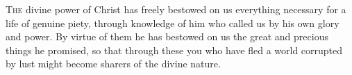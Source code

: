 
\lettrine{T}{he} divine power of Christ has freely bestowed on us everything necessary for a life of genuine piety, through knowledge of him who called us by his own glory and power. By virtue of them he has bestowed on us the great and precious things he promised, so that through these you who have fled a world corrupted by lust might become sharers of the divine nature.
